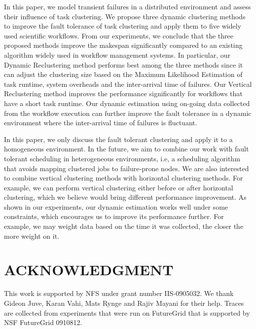 \documentclass{IOS-Book-Article}
\begin{document}
In this paper, we model transient failures in a distributed environment and assess their influence of task clustering. We propose three dynamic clustering methods to improve the fault tolerance of task clustering and apply them to five widely used scientific workflows. From our experiments, we conclude that the three proposed methods improve the makespan significantly compared to an existing algorithm widely used in workflow management systems. In particular, our Dynamic Reclustering method performs best among the three methods since it can adjust the clustering size based on the Maximum Likelihood Estimation of task runtime, system overheads and the inter-arrival time of failures. Our Vertical Reclustering method improves the performance significantly for  workflows that have a short task runtime. Our dynamic estimation using on-going data collected from the workflow execution can further improve the fault tolerance in a dynamic environment where the inter-arrival time of failures is fluctuant. 

In this paper, we only discuss the fault tolerant clustering and apply it to a homogeneous environment. In the future, we aim to combine our work with fault tolerant scheduling in heterogeneous environments, i.e, a scheduling algorithm that avoids mapping clustered jobs to failure-prone nodes. We are also interested to combine vertical clustering methods with horizontal clustering methods. For example, we can perform vertical clustering either before or after horizontal clustering, which we believe would bring different performance improvement. 
As shown in our experiments, our dynamic estimation works well under some constraints, which encourages us to improve its performance further. For example, we may weight data based on the time it was collected, the closer the more weight on it. 

\section{ACKNOWLEDGMENT}
This work is supported by NFS under grant number IIS-0905032. We thank Gideon Juve, Karan Vahi, Mats Rynge and Rajiv Mayani for their help. Traces are collected from experiments that were run on FutureGrid that is supported by NSF FutureGrid 0910812. 





\end{document}
